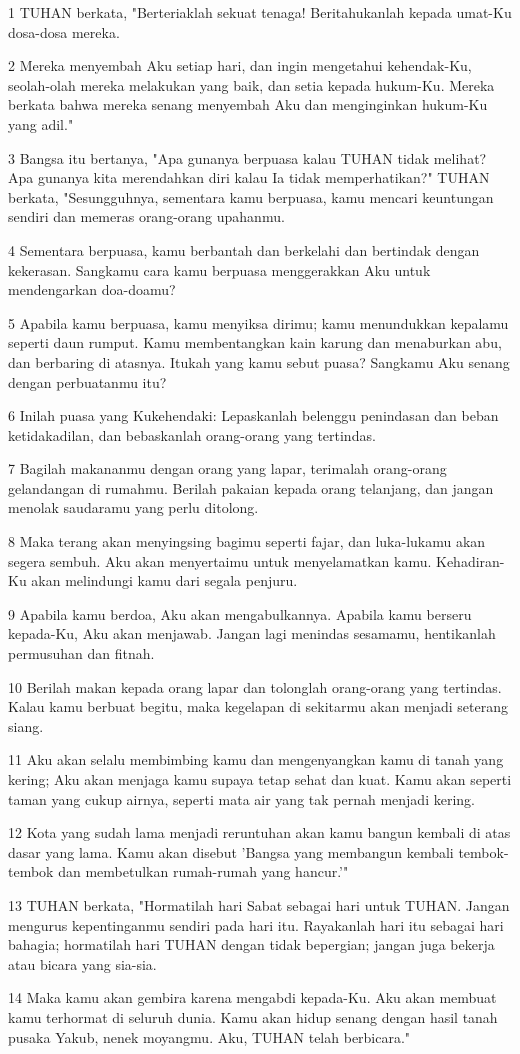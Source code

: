 \par 1 TUHAN berkata, "Berteriaklah sekuat tenaga! Beritahukanlah kepada umat-Ku dosa-dosa mereka.
\par 2 Mereka menyembah Aku setiap hari, dan ingin mengetahui kehendak-Ku, seolah-olah mereka melakukan yang baik, dan setia kepada hukum-Ku. Mereka berkata bahwa mereka senang menyembah Aku dan menginginkan hukum-Ku yang adil."
\par 3 Bangsa itu bertanya, "Apa gunanya berpuasa kalau TUHAN tidak melihat? Apa gunanya kita merendahkan diri kalau Ia tidak memperhatikan?" TUHAN berkata, "Sesungguhnya, sementara kamu berpuasa, kamu mencari keuntungan sendiri dan memeras orang-orang upahanmu.
\par 4 Sementara berpuasa, kamu berbantah dan berkelahi dan bertindak dengan kekerasan. Sangkamu cara kamu berpuasa menggerakkan Aku untuk mendengarkan doa-doamu?
\par 5 Apabila kamu berpuasa, kamu menyiksa dirimu; kamu menundukkan kepalamu seperti daun rumput. Kamu membentangkan kain karung dan menaburkan abu, dan berbaring di atasnya. Itukah yang kamu sebut puasa? Sangkamu Aku senang dengan perbuatanmu itu?
\par 6 Inilah puasa yang Kukehendaki: Lepaskanlah belenggu penindasan dan beban ketidakadilan, dan bebaskanlah orang-orang yang tertindas.
\par 7 Bagilah makananmu dengan orang yang lapar, terimalah orang-orang gelandangan di rumahmu. Berilah pakaian kepada orang telanjang, dan jangan menolak saudaramu yang perlu ditolong.
\par 8 Maka terang akan menyingsing bagimu seperti fajar, dan luka-lukamu akan segera sembuh. Aku akan menyertaimu untuk menyelamatkan kamu. Kehadiran-Ku akan melindungi kamu dari segala penjuru.
\par 9 Apabila kamu berdoa, Aku akan mengabulkannya. Apabila kamu berseru kepada-Ku, Aku akan menjawab. Jangan lagi menindas sesamamu, hentikanlah permusuhan dan fitnah.
\par 10 Berilah makan kepada orang lapar dan tolonglah orang-orang yang tertindas. Kalau kamu berbuat begitu, maka kegelapan di sekitarmu akan menjadi seterang siang.
\par 11 Aku akan selalu membimbing kamu dan mengenyangkan kamu di tanah yang kering; Aku akan menjaga kamu supaya tetap sehat dan kuat. Kamu akan seperti taman yang cukup airnya, seperti mata air yang tak pernah menjadi kering.
\par 12 Kota yang sudah lama menjadi reruntuhan akan kamu bangun kembali di atas dasar yang lama. Kamu akan disebut 'Bangsa yang membangun kembali tembok-tembok dan membetulkan rumah-rumah yang hancur.'"
\par 13 TUHAN berkata, "Hormatilah hari Sabat sebagai hari untuk TUHAN. Jangan mengurus kepentinganmu sendiri pada hari itu. Rayakanlah hari itu sebagai hari bahagia; hormatilah hari TUHAN dengan tidak bepergian; jangan juga bekerja atau bicara yang sia-sia.
\par 14 Maka kamu akan gembira karena mengabdi kepada-Ku. Aku akan membuat kamu terhormat di seluruh dunia. Kamu akan hidup senang dengan hasil tanah pusaka Yakub, nenek moyangmu. Aku, TUHAN telah berbicara."


